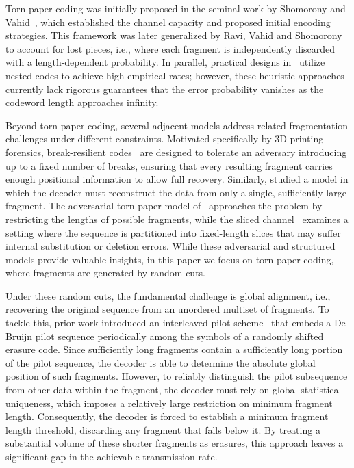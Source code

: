 \documentclass[journal,letterpaper,onecolumn,11pt]{IEEEtran}
\begin{document}
Torn paper coding was initially proposed in the seminal work by Shomorony and Vahid~\cite{shomorony2021torn}, which established the channel capacity and proposed initial encoding strategies. 
This framework was later generalized by Ravi, Vahid and Shomorony~\cite{ravi2024recovering} to account for lost pieces, i.e., where each fragment is independently discarded with a length-dependent probability. 
In parallel, practical designs in~\cite{nassirpour2023dna, jiao2025efficient} utilize nested codes to achieve high empirical rates; however, these heuristic approaches currently lack rigorous guarantees that the error probability vanishes as the codeword length approaches infinity.

Beyond torn paper coding, several adjacent models address related fragmentation challenges under different constraints.
Motivated specifically by 3D printing forensics, break-resilient codes~\cite{wang2024breakresilientcodesforensic3d}  are designed to tolerate an adversary introducing up to a fixed number of breaks, ensuring that every resulting fragment carries enough positional information to allow full recovery.
Similarly, \cite{liu2025single} studied a model in which the decoder must reconstruct the data from only a single, sufficiently large fragment.
The adversarial torn paper model of~\cite{barlev} approaches the problem by restricting the lengths of possible fragments, while the sliced channel~\cite{sima2023error} examines a setting where the sequence is partitioned into fixed-length slices that may suffer internal substitution or deletion errors.
While these adversarial and structured models provide valuable insights, in this paper we focus on torn paper coding, where fragments are generated by random cuts.

Under these random cuts, the fundamental challenge is global alignment, i.e., recovering the original sequence from an unordered multiset of fragments. 
To tackle this, prior work introduced an interleaved-pilot scheme~\cite{shomorony2021torn} that embeds a De Bruijn  pilot sequence periodically among the symbols of a randomly shifted erasure code. 
Since sufficiently long fragments contain a sufficiently long portion of the pilot sequence,
the decoder is able to determine the absolute global position of such fragments. 
However, to reliably distinguish the pilot subsequence from other data within the fragment, the decoder must rely on global statistical uniqueness, which imposes a relatively large restriction on minimum fragment length.
Consequently, the decoder is forced to establish a minimum fragment length threshold, discarding any fragment that falls below it. 
By treating a substantial volume of these shorter fragments as erasures, this approach leaves a significant gap in the achievable transmission rate.
\end{document}
